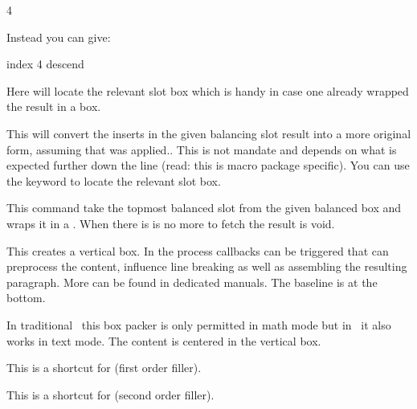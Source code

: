 \starttyping
{}  4
\stoptyping

Instead you can give:

\starttyping
{}  index 4 descend \relax
\stoptyping

Here  will locate the relevant slot box which is handy in case one
already wrapped the result in a box.

\stopnewprimitive

\startnewprimitive[title={\prm {vbalancedreinsert}}]

This will convert the inserts in the given balancing slot result into a more
original form, assuming that  was applied.. This is not
mandate and depends on what is expected further down the line (read: this is
macro package specific). You can use the keyword  to locate the
relevant slot box.

\stopnewprimitive

\startnewprimitive[title={\prm {vbalancedtop}}]

This command take the topmost balanced slot from the given balanced box and wraps
it in a \type {\vbox}. When there is is no more to fetch the result is void.

\stopnewprimitive

\startoldprimitive[title={\prm {vbox}}]

This creates a vertical box. In the process callbacks can be triggered that can
preprocess the content, influence line breaking as well as assembling the
resulting paragraph. More can be found in dedicated manuals. The baseline is
at the bottom.

\stopoldprimitive

\startoldprimitive[title={\prm {vcenter}}]

In traditional \TEX\ this box packer is only permitted in math mode but in
\LUAMETATEX\ it also works in text mode. The content is centered in the vertical
box.

\stopoldprimitive

\startoldprimitive[title={\prm {vfil}}]

This is a shortcut for  (first order filler).

\stopoldprimitive

\startoldprimitive[title={\prm {vfill}}]

This is a shortcut for  (second order filler).

\stopoldprimitive

